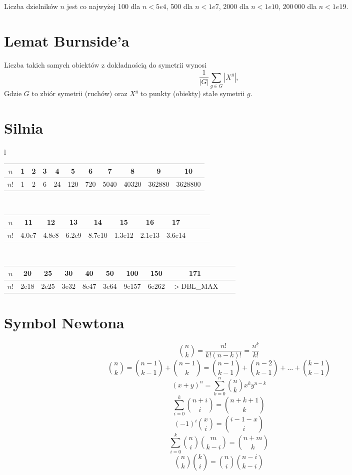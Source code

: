 	Liczba dzielników $n$ jest co najwyżej 100 dla $n < 5e4$, 500 dla $n < 1e7$, 2000 dla $n < 1e10$, 200\,000 dla $n < 1e19$.


\section{Lemat Burnside'a}
	Liczba takich samych obiektów z dokładnością do symetrii wynosi
	 \[ {\frac {1}{|G|}}\sum _{{g\in G}}|X^{g}|, \]
	Gdzie $G$ to zbiór symetrii (ruchów) oraz $X^g$ to punkty (obiekty) stałe symetrii $g$.

\section{Silnia}
		\begin{center}
			\begin{tabular}{l}
				\begin{tabular}{c|c@{\ }c@{\ }c@{\ }c@{\ }c@{\ }c@{\ }c@{\ }c@{\ }c@{\ }c}
					$n$  & 1 & 2 & 3 & 4  & 5   & 6   & 7    & 8     & 9      & 10\\
					\hline
					$n!$ & 1 & 2 & 6 & 24 & 120 & 720 & 5040 & 40320 & 362880 & 3628800\\
				\end{tabular}\\
					\begin{tabular}{c|c@{\ }c@{\ }c@{\ }c@{\ }c@{\ }c@{\ }c@{\ }c@{\ }c@{\ }c}
					$n$  & 11    & 12    & 13    & 14     & 15     & 16     & 17\\
					\hline
					$n!$ & 4.0e7 & 4.8e8 & 6.2e9 & 8.7e10 & 1.3e12 & 2.1e13 & 3.6e14\\
				\end{tabular}\\
				\begin{tabular}{c|c@{\ }c@{\ }c@{\ }c@{\ }c@{\ }c@{\ }c@{\ }c@{\ }c@{\ }c}
					$n$  & 20   & 25   & 30   & 40   & 50   & 100   & 150   & 171\\
					\hline
					$n!$ & 2e18 & 2e25 & 3e32 & 8e47 & 3e64 & 9e157 & 6e262 & \scriptsize{$>$DBL\_MAX}\\
				\end{tabular}
			\end{tabular}
		\end{center}

\section{Symbol Newtona}
		$$ \binom{n}{k}=\dfrac{n!}{k!\left(n-k\right)!}=\dfrac{n^{\underline{k}}}{k!}$$
		$$ \binom{n}{k}=\binom{n-1}{k-1}+\binom{n-1}{k}=\binom{n-1}{k-1}+\binom{n-2}{k-1}+\dots+\binom{k-1}{k-1}$$
		$$ (x+y)^n=\sum_{k=0}^n \binom{n}{k} x^k y^{n-k} $$
		$$ \sum_{i=0}^k \binom{n+i}{i} = \binom{n+k+1}{k} $$
		$$ \left(-1\right)^i \binom{x}{i} = \binom{i - 1 - x}{i} $$
		$$ \sum_{i=0}^k \binom{n}{i} \binom{m}{k - i} = \binom{n + m}{k} $$
		$$ \binom{n}{k} \binom{k}{i} = \binom{n}{i} \binom{n - i}{k - i} $$


